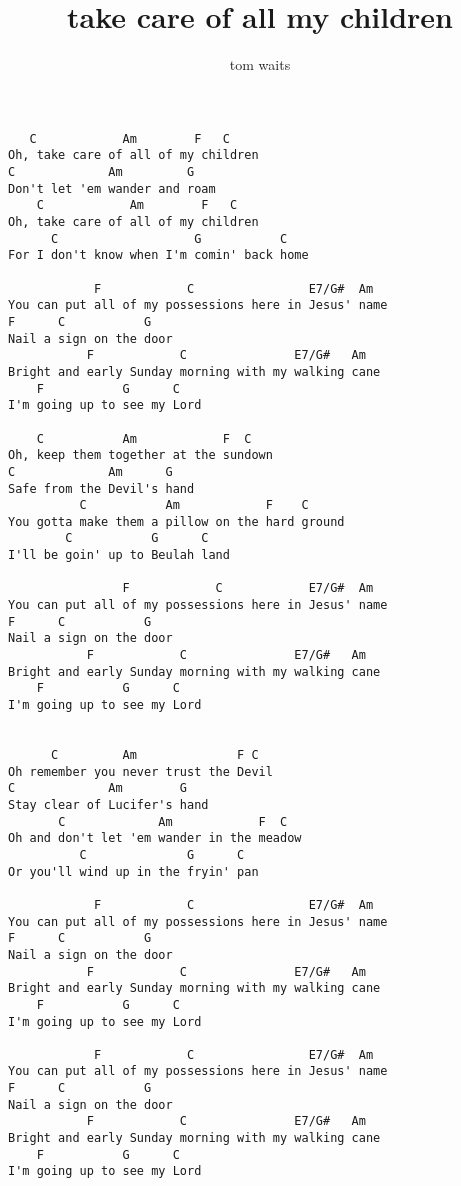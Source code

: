 \author{tom waits}
\title{take care of all my children}
\maketitle
\begin{verbatim}
   C            Am        F   C
Oh, take care of all of my children
C             Am         G
Don't let 'em wander and roam
    C            Am        F   C
Oh, take care of all of my children
      C                   G           C
For I don't know when I'm comin' back home

            F            C                E7/G#  Am
You can put all of my possessions here in Jesus' name
F      C           G
Nail a sign on the door
           F            C               E7/G#   Am
Bright and early Sunday morning with my walking cane
    F           G      C
I'm going up to see my Lord

    C           Am            F  C
Oh, keep them together at the sundown
C             Am      G
Safe from the Devil's hand
          C           Am            F    C
You gotta make them a pillow on the hard ground
        C           G      C
I'll be goin' up to Beulah land

                F            C            E7/G#  Am
You can put all of my possessions here in Jesus' name
F      C           G
Nail a sign on the door
           F            C               E7/G#   Am
Bright and early Sunday morning with my walking cane
    F           G      C
I'm going up to see my Lord


      C         Am              F C
Oh remember you never trust the Devil
C             Am        G
Stay clear of Lucifer's hand
       C             Am            F  C
Oh and don't let 'em wander in the meadow
          C              G      C
Or you'll wind up in the fryin' pan

            F            C                E7/G#  Am
You can put all of my possessions here in Jesus' name
F      C           G
Nail a sign on the door
           F            C               E7/G#   Am
Bright and early Sunday morning with my walking cane
    F           G      C
I'm going up to see my Lord

            F            C                E7/G#  Am
You can put all of my possessions here in Jesus' name
F      C           G
Nail a sign on the door
           F            C               E7/G#   Am
Bright and early Sunday morning with my walking cane
    F           G      C
I'm going up to see my Lord
\end{verbatim}